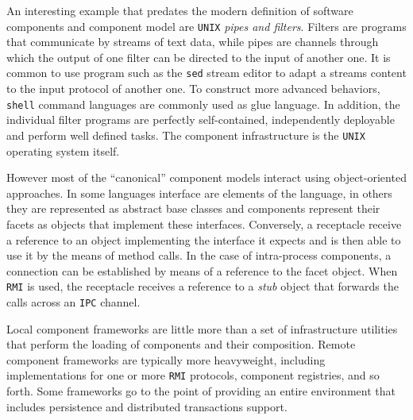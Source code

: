 An interesting example that predates the modern definition of software components and component model are \texttt{UNIX}
\emph{pipes and filters}. Filters are programs that communicate by streams of text data, while pipes are channels through
which the output of one filter can be directed to the input of another one. It is common to use program such as the \texttt{sed}
stream editor to adapt a streams content to the input protocol of another one. To construct more advanced behaviors, \texttt{shell}
command languages are commonly used as glue language. In addition, the individual filter programs are perfectly self-contained,
independently deployable and perform well defined tasks. The component infrastructure is the \texttt{UNIX} operating system itself.

However most of the ``canonical'' component models interact using object-oriented approaches. In some languages interface are elements
of the language, in others they are represented as abstract
base classes and components represent their facets as objects that implement these interfaces. Conversely, a receptacle
receive a reference to an object implementing the interface it expects and is then able to use it by the means of method calls.
In the case of intra-process components, a connection can be established by means of a reference to the facet object.
When \texttt{RMI} is used, the receptacle receives a reference to a \emph{stub} object that forwards the calls across an \texttt{IPC} channel. 

Local component frameworks are little more than a set of infrastructure utilities that perform the loading of components and their composition.
Remote component frameworks are typically more heavyweight, including implementations for one or more \texttt{RMI} protocols, component registries,
and so forth. Some frameworks go to the point of providing an entire environment that includes persistence and distributed transactions support.

